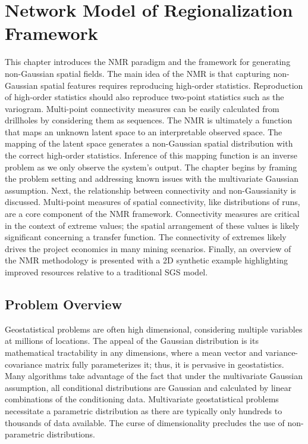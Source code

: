 
\chapter{Network Model of Regionalization Framework}
\label{ch:03framework}

This chapter introduces the \gls{NMR} paradigm and the framework for generating non-Gaussian spatial fields. The main idea of the \gls{NMR} is that capturing non-Gaussian spatial features requires reproducing high-order statistics. Reproduction of high-order statistics should also reproduce two-point statistics such as the variogram. Multi-point connectivity measures can be easily calculated from drillholes by considering them as sequences. The \gls{NMR} is ultimately a function that maps an unknown latent space to an interpretable observed space. The mapping of the latent space generates a non-Gaussian spatial distribution with the correct high-order statistics. Inference of this mapping function is an inverse problem as we only observe the system's output. The chapter begins by framing the problem setting and addressing known issues with the multivariate Gaussian assumption. Next, the relationship between connectivity and non-Gaussianity is discussed. Multi-point measures of spatial connectivity, like distributions of runs, are a core component of the \gls{NMR} framework. Connectivity measures are critical in the context of extreme values; the spatial arrangement of these values is likely significant concerning a transfer function. The connectivity of extremes likely drives the project economics in many mining scenarios. Finally, an overview of the \gls{NMR} methodology is presented with a \gls{2D} synthetic example highlighting improved resources relative to a traditional \gls{SGS} model.


\FloatBarrier
\section{Problem Overview}
\label{sec:03overview}

Geostatistical problems are often high dimensional, considering multiple variables at millions of locations. The appeal of the Gaussian distribution is its mathematical tractability in  any dimensions, where a mean vector and variance-covariance matrix fully parameterizes it; thus, it is pervasive in geostatistics. Many algorithms take advantage of the fact that under the multivariate Gaussian assumption, all conditional distributions are Gaussian and calculated by linear combinations of the conditioning data. Multivariate geostatistical problems necessitate a parametric distribution as there are typically only hundreds to thousands of data available. The curse of dimensionality \citep{bellman1961adaptive} precludes the use of non-parametric distributions.

